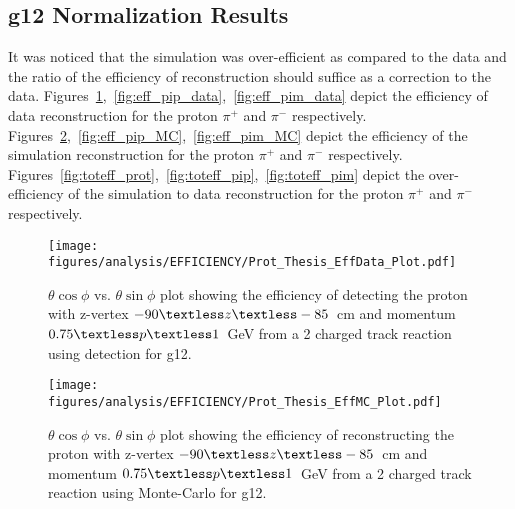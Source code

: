 \subsection{g12 Normalization Results}
It was noticed that the simulation was over-efficient as compared to the data and the ratio of the efficiency of reconstruction should suffice as a correction to the data. Figures~\ref{fig:eff_prot_data},~\ref{fig:eff_pip_data},~\ref{fig:eff_pim_data} depict the efficiency of data reconstruction for the proton $\pi^+$ and $\pi^-$ respectively. Figures~\ref{fig:eff_prot_MC},~\ref{fig:eff_pip_MC},~\ref{fig:eff_pim_MC} depict the efficiency of the simulation reconstruction for the proton $\pi^+$ and $\pi^-$ respectively. Figures~\ref{fig:toteff_prot},~\ref{fig:toteff_pip},~\ref{fig:toteff_pim} depict the over-efficiency of the simulation to data reconstruction for the proton $\pi^+$ and $\pi^-$ respectively.
\begin{figure}[h!]\begin{center}
\texttt{[image: \\figures/analysis/EFFICIENCY/Prot\_Thesis\_EffData\_Plot.pdf]}
\caption[$\theta \cos\phi$ vs. $\theta \sin\phi$ plot showing the efficiency of detecting the proton with z-vertex $-90\textless z\textless-85$~cm and momentum $0.75\textless p \textless 1$~GeV from a 2 charged track reaction using  detection for g12]{\label{fig:eff_prot_data} $\theta \cos\phi$ vs. $\theta \sin\phi$ plot showing the efficiency of detecting the proton with z-vertex $-90\textless z\textless-85$~cm and momentum $0.75\textless p \textless 1$~GeV from a 2 charged track reaction using  detection for g12.}
\end{center}\end{figure}
%
\begin{figure}[h!]\begin{center}
\texttt{[image: \\figures/analysis/EFFICIENCY/Prot\_Thesis\_EffMC\_Plot.pdf]}
\caption[$\theta \cos\phi$ vs. $\theta \sin\phi$ plot showing the efficiency of reconstructing the proton with z-vertex $-90\textless z\textless-85$~cm and momentum $0.75\textless p \textless 1$~GeV from a 2 charged track reaction using  Monte-Carlo for g12]{\label{fig:eff_prot_MC} $\theta \cos\phi$ vs. $\theta \sin\phi$ plot showing the efficiency of reconstructing the proton with z-vertex $-90\textless z\textless-85$~cm and momentum $0.75\textless p \textless 1$~GeV from a 2 charged track reaction using  Monte-Carlo for g12.}
\end{center}\end{figure}
